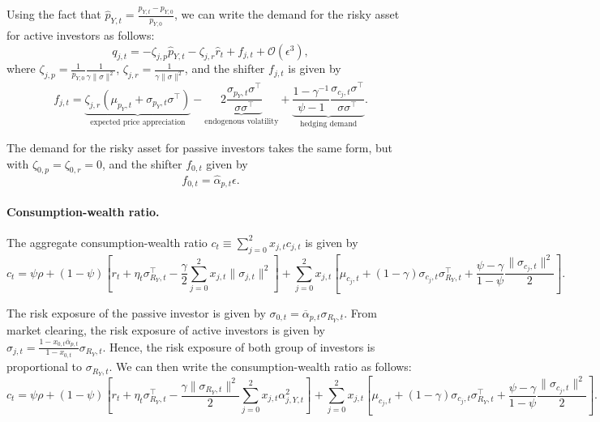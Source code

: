 Using the fact that $\hat{p}_{Y,t} = \frac{p_{Y,t} - p_{Y,0}}{p_{Y,0}}$, we can write the demand for the risky asset for active investors as follows:
\begin{equation}
    q_{j,t} = - \zeta_{j,p} \hat{p}_{Y,t} - \zeta_{j,r} \hat{r}_t + f_{j,t} + \mathcal{O}(\epsilon^3),
\end{equation}
where $\zeta_{j,p} = \frac{1}{p_{Y,0}}\frac{1}{\gamma \|\sigma\|^2}$, $\zeta_{j,r} = \frac{1}{\gamma \|\sigma\|^2}$, and the shifter $f_{j,t}$ is given by
\begin{equation}
    f_{j,t} = \underbrace{\zeta_{j,r} (\mu_{p_Y,t} +\sigma_{p_Y,t}\sigma^\top)}_{\text{expected price appreciation}}- \underbrace{2 \frac{\sigma_{p_Y,t} \sigma ^\top}{\sigma \sigma^\top}}_{\text{endogenous volatility}} +\underbrace{ \frac{1-\gamma^{-1}}{\psi-1} \frac{\sigma_{c_j,t} \sigma^\top}{\sigma \sigma^\top}}_{\text{hedging demand}}.
\end{equation}

The demand for the risky asset for passive investors takes the same form, but with $\zeta_{0,p} =\zeta_{0,r} = 0$, and the shifter $f_{0,t}$ given by
\begin{equation}
    f_{0,t} = \hat{\alpha}_{p,t} \epsilon.
\end{equation}

\paragraph{Consumption-wealth ratio.} The aggregate consumption-wealth ratio $c_{t} \equiv \sum_{j=0}^2 x_{j,t} c_{j,t}$ is given by
\begin{equation}
    c_{t} = \psi \rho + (1-\psi) \left[ r_t + \eta_t \sigma_{R_Y,t}^\top - \frac{\gamma}{2} \sum_{j=0}^2 x_{j,t} \|\sigma_{j,t}\|^2 \right] + \sum_{j=0}^2 x_{j,t} \left[\mu_{c_j,t} + (1-\gamma) \sigma_{c_j,t} \sigma_{R_Y,t}^\top + \frac{\psi - \gamma}{1-\psi} \frac{\|\sigma_{c_j,t}\|^2}{2}\right].
\end{equation}

The risk exposure of the passive investor is given by $\sigma_{0,t} = \overline{\alpha}_{p,t} \sigma_{R_Y,t}$. From market clearing, the risk exposure of active investors is given by $\sigma_{j,t} = \frac{1-x_{0,t}\overline{\alpha}_{p,t}}{1-x_{0,t}} \sigma_{R_Y,t}$. Hence, the risk exposure of both group of investors is proportional to $\sigma_{R_Y,t}$.
We can then write the consumption-wealth ratio as follows:
\begin{equation}
    c_{t} = \psi \rho + (1-\psi) \left[ r_t + \eta_t \sigma_{R_Y,t}^\top - \frac{\gamma\|\sigma_{R_Y,t}\|^2}{2} \sum_{j=0}^2 x_{j,t} \alpha_{j,Y,t}^2 \right] + \sum_{j=0}^2 x_{j,t} \left[\mu_{c_j,t} + (1-\gamma) \sigma_{c_j,t} \sigma_{R_Y,t}^\top + \frac{\psi - \gamma}{1-\psi} \frac{\|\sigma_{c_j,t}\|^2}{2}\right].
\end{equation}

